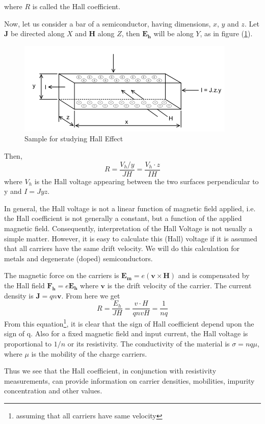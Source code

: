 \documentclass[%
 aip,
 amsmath,amssymb,
 reprint,%
]{revtex4-1}
\begin{document}
    where $R$ is called the Hall coefficient.
    \par
    Now, let us consider a bar of a semiconductor, having dimensions, $x$, $y$ and $z$. Let $\bm{J}$ be
    directed along $X$ and $\bm{H}$ along $Z$, then
    $\bm{E_h}$ will be along $Y$, as in figure (\ref{fig:sampstudy}).
    \begin{figure}
        \centering
        \includegraphics{Figures/study-hall.png}
        \caption{Sample for studying Hall Effect}
        \label{fig:sampstudy}
    \end{figure}
    Then,
    \begin{equation}
        R = \dfrac{V_h/y}{J H} = \dfrac{V_h \cdot z}{I H}
    \end{equation}
    where $V_h$ is the Hall voltage appearing between the two surfaces perpendicular to y and $I=Jyz$.
    \par
    In general, the Hall voltage is not a linear function of magnetic field applied, i.e. the
    Hall coefficient is not generally a constant, but a function of the applied magnetic field.
    Consequently, interpretation of the Hall Voltage is not usually a simple matter. However, it
    is easy to calculate this (Hall) voltage if it is assumed that all carriers have the same drift
    velocity. We will do this calculation for metals and degenerate (doped) semiconductors.
    \par
    The magnetic force on the carriers is $\bm{E_m} = e (\bm{v} \times \bm{H})$ and is compensated by the Hall
    field $\bm{F_h} = e \bm{E_h}$ where $\bm{v}$ is the drift velocity of the carrier. The current density is $\bm{J} = q n \bm{v}$. From here we get
    \begin{equation}
        R = \dfrac{E_h}{J H} = \dfrac{v \cdot H}{qnvH} = \dfrac{1}{nq}
    \end{equation}
    From this equation\footnote{assuming that all carriers have same velocity}, it is clear that the sign of Hall coefficient depend upon the sign of q. Also for a fixed magnetic field and input current, the Hall voltage is proportional to $1/n$ or its resistivity. The conductivity of the material is $\sigma = nq \mu$, where $\mu$ is the mobility of the charge carriers.
    \par
    Thus we see that the Hall coefficient, in conjunction with resistivity measurements, can provide information on carrier densities, mobilities, impurity concentration and other values.
\end{document}
